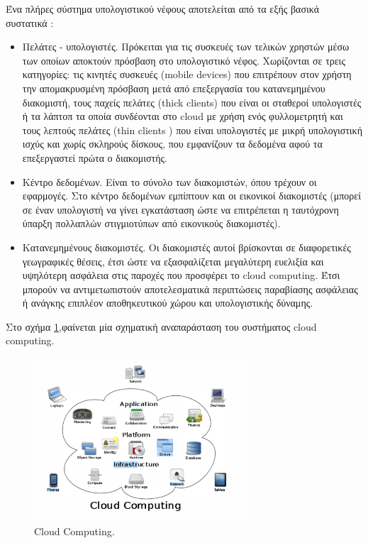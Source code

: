 	Ένα πλήρες σύστημα υπολογιστικού νέφους αποτελείται από τα εξής βασικά συστατικά : 
	\begin{itemize}
	\item Πελάτες - υπολογιστές. Πρόκειται για τις συσκευές των τελικών χρηστών μέσω των οποίων αποκτούν πρόσβαση στο υπολογιστικό νέφος. Χωρίζονται σε τρεις κατηγορίες: τις κινητές συσκευές (mobile devices) που επιτρέπουν στον χρήστη την απομακρυσμένη πρόσβαση μετά από επεξεργασία του κατανεμημένου διακομιστή, τους παχείς πελάτες (thick clients) που είναι οι σταθεροί υπολογιστές ή τα λάπτοπ τα οποία συνδέονται στο cloud με χρήση ενός φυλλομετρητή και τους λεπτούς πελάτες (thin clients ) που είναι υπολογιστές με μικρή υπολογιστική ισχύς και χωρίς σκληρούς δίσκους, που εμφανίζουν τα δεδομένα αφού τα επεξεργαστεί πρώτα ο διακομιστής.
	\item Κέντρο δεδομένων. Είναι το σύνολο των διακομιστών, όπου τρέχουν οι εφαρμογές. Στο κέντρο δεδομένων εμπίπτουν και οι εικονικοί διακομιστές (μπορεί σε έναν υπολογιστή να γίνει εγκατάσταση ώστε να επιτρέπεται η ταυτόχρονη ύπαρξη πολλαπλών στιγμιοτύπων από εικονικούς διακομιστές).
	\item Κατανεμημένους διακομιστές. Οι διακομιστές αυτοί βρίσκονται σε διαφορετικές γεωγραφικές θέσεις, έτσι ώστε να εξασφαλίζεται μεγαλύτερη ευελιξία και υψηλότερη ασφάλεια στις παροχές που προσφέρει το cloud computing. Έτσι μπορούν να αντιμετωπιστούν αποτελεσματικά περιπτώσεις παραβίασης ασφάλειας ή ανάγκης επιπλέον αποθηκευτικού χώρου και υπολογιστικής δύναμης.
	\end{itemize}		
	
	Στο σχήμα   \ref{fig:cloud},φαίνεται μία σχηματική αναπαράσταση του συστήματος cloud computing.
	
			\begin{figure}[h]
	    \centering
	    \includegraphics[width=0.7\textwidth]{cloud.png}
	    \caption{ Cloud Computing.  }
	    \label{fig:cloud}
	\end{figure}

